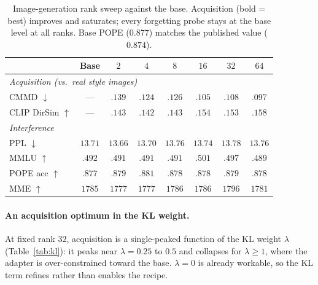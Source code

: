 \documentclass{article}
\begin{document}
\begin{table}[t]
\centering\small
\setlength{\tabcolsep}{6pt}
\begin{tabular}{lccccccc}
\toprule
 & \textbf{Base} & $2$ & $4$ & $8$ & $16$ & $32$ & $64$ \\
\midrule
\multicolumn{8}{l}{\textit{Acquisition (vs.\ real style images)}}\\
CMMD $\downarrow$       & ---     & $.139$ & $.124$ & $.126$ & $.105$ & $.108$ & $\mathbf{.097}$ \\
CLIP DirSim $\uparrow$  & ---     & $.143$ & $.142$ & $.143$ & $.154$ & $.153$ & $\mathbf{.158}$ \\
\midrule
\multicolumn{8}{l}{\textit{Interference}}\\
PPL $\downarrow$        & $13.71$ & $13.66$ & $13.70$ & $13.76$ & $13.74$ & $13.78$ & $13.76$ \\
MMLU $\uparrow$         & $.492$  & $.491$ & $.491$ & $.491$ & $.501$ & $.497$ & $.489$ \\
POPE acc $\uparrow$     & $.877$  & $.879$ & $.881$ & $.878$ & $.878$ & $.879$ & $.878$ \\
MME $\uparrow$          & $1785$  & $1777$ & $1777$ & $1786$ & $1786$ & $1796$ & $1781$ \\
\bottomrule
\end{tabular}
\caption{Image-generation rank sweep against the base. Acquisition (bold = best)
improves and saturates; every forgetting probe stays at the base level at all
ranks. Base POPE ($0.877$) matches the published value ($0.874$).}
\label{tab:rank}
\end{table}

\paragraph{An acquisition optimum in the KL weight.}
At fixed rank $32$, acquisition is a single-peaked function of the KL weight
$\lambda$ (Table~\ref{tab:kl}): it peaks near $\lambda{=}0.25$ to $0.5$ and
collapses for $\lambda\geq1$, where the adapter is over-constrained toward the
base. $\lambda{=}0$ is already workable, so the KL term refines rather than
enables the recipe.
\end{document}
